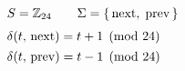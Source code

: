 \documentclass[12pt]{article}
\begin{document}
\[\begin{array}{@{}l@{}}
  S = \mathbb{Z}_{24} \qquad \Sigma = \{\,\mathrm{next},\; \mathrm{prev}\,\} \\[6pt]
  \delta(t,\, \mathrm{next}) = t + 1 \pmod{24} \\[4pt]
  \delta(t,\, \mathrm{prev}) = t - 1 \pmod{24}
\end{array}\]
\end{document}
